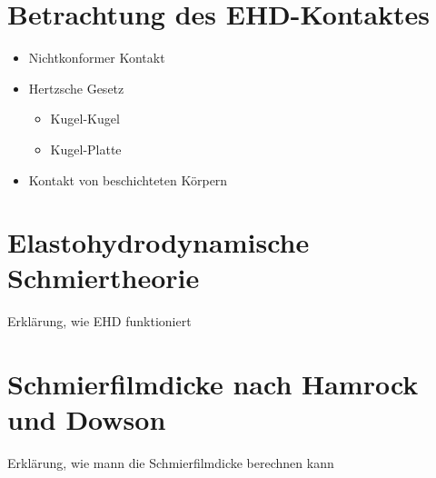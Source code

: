 \section{Betrachtung des EHD-Kontaktes}
\label{sec:betrachtung_des_ehd_kontaktes}
\begin{itemize}
    \item Nichtkonformer Kontakt
    \item Hertzsche Gesetz
        \begin{itemize}
            \item Kugel-Kugel
            \item Kugel-Platte
        \end{itemize}
    \item Kontakt von beschichteten Körpern
\end{itemize}

\section{Elastohydrodynamische Schmiertheorie}
\label{elastohydrodynamische_schmiertheorie}
Erklärung, wie EHD funktioniert

\section{Schmierfilmdicke nach Hamrock und Dowson}
\label{sec:schmierfilmdicke_nach_hamrock_und_dowson}
Erklärung, wie mann die Schmierfilmdicke berechnen kann


